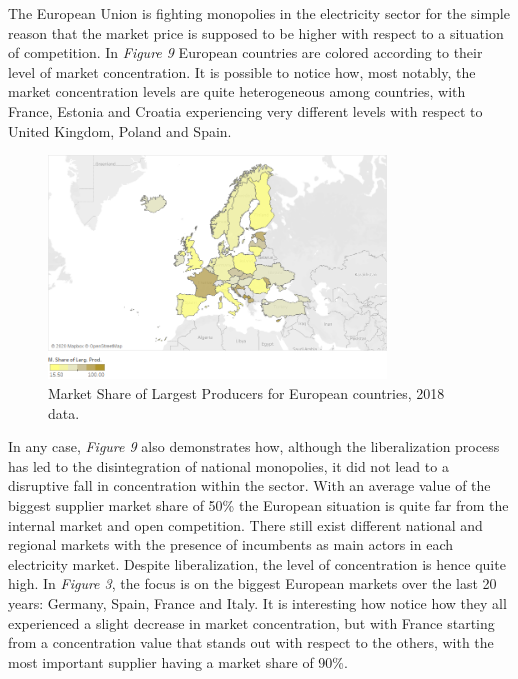 \documentclass{book}
\begin{document}
The European Union is fighting monopolies in the electricity sector for the simple reason that the market price is supposed to be higher with respect to a situation of competition. In \textit{Figure 9} European countries are colored according to their level of market concentration. It is possible to notice how, most notably, the market concentration levels are quite heterogeneous among countries, with France, Estonia and Croatia experiencing very different levels with respect to United Kingdom, Poland and Spain. 

\bigskip
\begin{figure}[H]
\begin{center}
\captionsetup{justification=centering}
\includegraphics[width=0.8\textwidth]{Images/conc.png}
\caption{Market Share of Largest Producers for European countries, 2018 data. }
\end{center}
\end{figure}
\bigskip

In any case, \textit{Figure 9} also demonstrates how, although the liberalization process has led to the disintegration of national monopolies, it did not lead to a disruptive fall in concentration within the sector. With an average value of the biggest  supplier market share of 50\% the European situation is quite far from the internal market and open competition. There still exist different national and regional markets with the presence of incumbents as main actors in each electricity market. Despite liberalization, the level of concentration is hence quite high.  In \textit{Figure 3}, the focus is on the biggest European markets over the last 20 years: Germany, Spain, France and Italy. It is interesting how notice how they all experienced a slight decrease in market concentration, but with France starting from a concentration value that stands out with respect to the others, with the most important supplier having a market share of 90\%.
\end{document}
